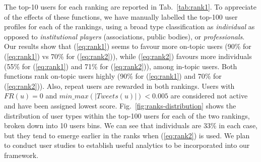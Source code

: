 The top-10 users for each ranking are reported in Tab.~\ref{tab:rank1}. To appreciate of the effects of these functions, we have manually labelled the top-100 user profiles for each of the rankings, using a broad type classification as \textit{individual} as opposed to \textit{institutional players} (associations, public bodies), or \textit{professionals}. 
Our results show that  (\ref{eq:rank1}) seems to favour more on-topic users (90\% for  (\ref{eq:rank1})  vs 70\% for  (\ref{eq:rank2})), 
while  (\ref{eq:rank2}) favours more individuals (55\% for (\ref{eq:rank1})  and 71\% for (\ref{eq:rank2})), among in-topic users.
%
Both functions rank on-topic users highly (90\% for (\ref{eq:rank1}) and 70\% for (\ref{eq:rank2})).
Also, repeat users are rewarded in both rankings. Users with $\mathit{FR}(u) = 0$ and $\mathit{min\_max(\lvert Tweets (u)\rvert) < 0.005}$ are considered not active and have been assigned lowest score.
Fig.~\ref{fig:ranks-distribution} shows the distribution of user types within the top-100 users for each of the two rankings, broken down into 10 users bins. We can see that individuals are 33\% in each case, but they tend to emerge earlier in the ranks when (\ref{eq:rank2}) is used.
We plan to conduct user studies to establish useful analytics to be incorporated into our framework. 
